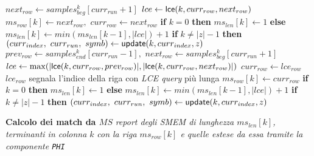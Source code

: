 \begin{algorithm}
\begin{algorithmic}[1]
    \State $next_{row}\gets samples_{beg}^k[curr_{run}+1]$ 
    \State $lce\gets \mbox{\rm {\sf lce}}(k, curr_{row}, next_{row})$
    \State $ms_{row}[k]\gets next_{row},\,\,curr_{row}\gets next_{row}$
    \State \textbf{if} $k=0$ \textbf{then} $ms_{len}[k] \gets 1$ \textbf{else}
    $ms_{len}[k] \gets min(ms_{len}[k-1], |lce|)+1$
    \State \textbf{if} $k\neq |z|-1$ \textbf{then} $(curr_{index},\,\,
    curr_{run},\,\,symb)\gets \mbox{\rm {\sf update}}(k, curr_{index},z)$  
    \Else
    \State $prev_{row}\gets samples_{end}^k[curr_{run}-1],\,\,next_{row}\gets
    samples_{beg}^k[curr_{run}+1]$ 
    \State $lce\gets \max (|\mbox{\rm {\sf lce}}(k, curr_{row}, prev_{row})|, |\mbox{\rm {\sf lce}}(k,
    curr_{row}, next_{row})|)$
    \State $curr_{row}\gets lce_{row}$
    \Comment $lce_{row}$ segnala l'indice della riga con \textit{LCE query} più
    lunga 
    \State $ms_{row}[k]\gets curr_{row}$
    \State \textbf{if} $k=0$ \textbf{then} $ms_{len}[k] \gets 1$ \textbf{else}
    $ms_{len}[k] \gets min(ms_{len}[k-1], |lce|)+1$
    \State \textbf{if} $k\neq |z|-1$ \textbf{then}
    $(curr_{index},\,\,curr_{run},\,\,symb)\gets \mbox{\rm {\sf update}}(k, curr_{index},z)$ 
    \EndIf
    \EndIf
    \EndIf
    \EndFor
    
    \For {\textit{every} $k\in[0,|z|)$}
    \Comment \textbf{Calcolo dei match da $MS$}
    \State \textit{report degli SMEM di lunghezza $ms_{len}[k]$, terminanti in
    colonna $k$}
    \State \textit{con la riga $ms_{row}[k]$ e quelle estese da essa tramite
    la componente \texttt{PHI}} 
    \EndIf
    \EndFor
    \EndFunction
    
  \end{algorithmic}
  \caption{\footnotesize{Calcolo degli SMEM con aplotipo esterno con componenti
  \texttt{MAP-INT/BV} (i cui usi diversificati sono segnalati con ``oppure''),
  \texttt{LCE}, \texttt{PERM} e \texttt{PHI}.}}
  \label{algo:matchlce}
\end{algorithm}
